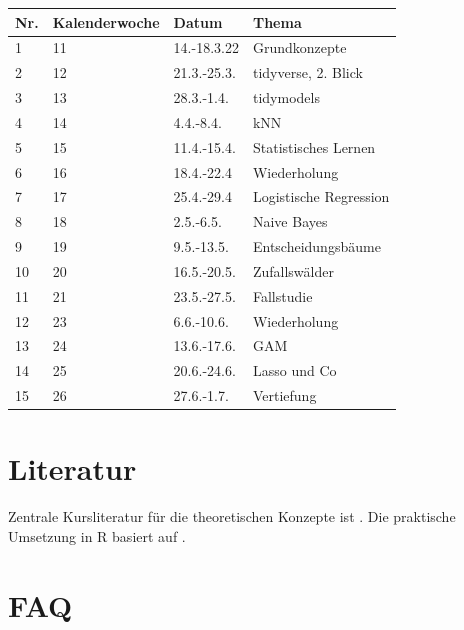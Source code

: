 \documentclass[
]{book}
\begin{document}
\begin{longtable}[]{@{}llll@{}}
\toprule
Nr. & Kalenderwoche & Datum & Thema \\
\midrule
\endhead
1 & 11 & 14.-18.3.22 & Grundkonzepte \\
2 & 12 & 21.3.-25.3. & tidyverse, 2. Blick \\
3 & 13 & 28.3.-1.4. & tidymodels \\
4 & 14 & 4.4.-8.4. & kNN \\
5 & 15 & 11.4.-15.4. & Statistisches Lernen \\
6 & 16 & 18.4.-22.4 & Wiederholung \\
7 & 17 & 25.4.-29.4 & Logistische Regression \\
8 & 18 & 2.5.-6.5. & Naive Bayes \\
9 & 19 & 9.5.-13.5. & Entscheidungsbäume \\
10 & 20 & 16.5.-20.5. & Zufallswälder \\
11 & 21 & 23.5.-27.5. & Fallstudie \\
12 & 23 & 6.6.-10.6. & Wiederholung \\
13 & 24 & 13.6.-17.6. & GAM \\
14 & 25 & 20.6.-24.6. & Lasso und Co \\
15 & 26 & 27.6.-1.7. & Vertiefung \\
\bottomrule
\end{longtable}

\hypertarget{literatur}{%
\section{Literatur}\label{literatur}}

Zentrale Kursliteratur für die theoretischen Konzepte ist \citep{rhys_machine_2020}.
Die praktische Umsetzung in R basiert auf \citep{silge_tidy_2022}.

\hypertarget{faq}{%
\section{FAQ}\label{faq}}
\end{document}
